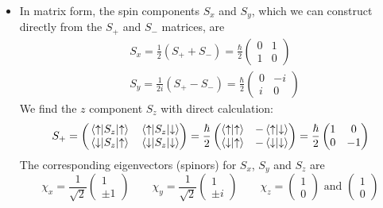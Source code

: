 \documentclass[11pt, a4paper]{article}
\newcommand{\ua}{\uparrow}  %
\newcommand{\da}{\downarrow}  %
\begin{document}
\begin{itemize}
	\item In matrix form, the spin components $ S_{x} $ and $ S_{y} $, which we can construct directly from the $ S_{+} $ and $ S_{-} $ matrices, are
	\begin{align*}
		& S_{x} = \frac{1}{2}(S_{+} + S_{-}) = \frac{\hbar}{2}
		\begin{pmatrix}
			0 & 1\\
			1 & 0
		\end{pmatrix}
		\\
		& S_{y} = \frac{1}{2i}(S_{+} - S_{-}) = \frac{\hbar}{2}
		\begin{pmatrix}
			0 & - i\\
			i & 0
		\end{pmatrix}
	\end{align*}
	We find the $ z $ component $ S_{z} $ with direct calculation:
	\begin{equation*}
		S_{+} = 
		\begin{pmatrix}
			\mel{\ua}{S_{z}}{\ua} & \mel{\ua}{S_{z}}{\da}\\
			\mel{\da}{S_{z}}{\ua} & \mel{\da}{S_{z}}{\da}
		\end{pmatrix}
		= \frac{\hbar}{2}
		\begin{pmatrix}
			\braket{\ua}{\ua} & - \braket{\ua}{\da}\\
			\braket{\da}{\ua} & - \braket{\da}{\da}
		\end{pmatrix}
		= \frac{\hbar}{2}
		\begin{pmatrix}
			1 & 0\\
			0 & -1
		\end{pmatrix}
	\end{equation*}
	The corresponding eigenvectors (spinors) for $ S_{x} $, $ S_{y} $ and $ S_{z} $ are
	\begin{equation*}
		\chi_{x} = \frac{1}{\sqrt{2}}
		\begin{pmatrix}
			1\\
			\pm 1
		\end{pmatrix} \qquad 
		\chi_{y} = \frac{1}{\sqrt{2}}
		\begin{pmatrix}
			1\\
			\pm i
		\end{pmatrix} \qquad
		\chi_{z} =
		\begin{pmatrix}
			1\\
			0
		\end{pmatrix}
		\text{ and }
		\begin{pmatrix}
			1\\
			0
		\end{pmatrix}
	\end{equation*}
	

\end{itemize}
\end{document}
